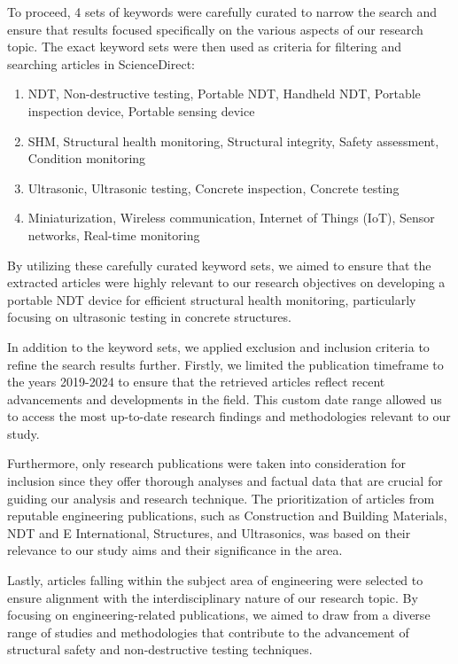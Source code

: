 \documentclass[journal, a4paper]{IEEEtran}
\begin{document}
To proceed, 4 sets of keywords were carefully curated to narrow the search and ensure that results focused
specifically on the various aspects of our research topic. The exact keyword sets were then used as criteria
for filtering and searching articles in ScienceDirect:

\begin{enumerate}
  \item NDT, Non-destructive testing, Portable NDT, Handheld NDT, Portable inspection device, Portable sensing device
  \item SHM, Structural health monitoring, Structural integrity, Safety assessment, Condition monitoring
  \item Ultrasonic, Ultrasonic testing, Concrete inspection, Concrete testing
  \item Miniaturization, Wireless communication, Internet of Things (IoT), Sensor networks, Real-time monitoring
\end{enumerate}

By utilizing these carefully curated keyword sets,
we aimed to ensure that the extracted articles were highly relevant to our research objectives on developing
a portable NDT device for efficient structural health monitoring, particularly focusing on ultrasonic testing
in concrete structures. 

In addition to the keyword sets, we applied exclusion and inclusion criteria to refine the search results further.
Firstly, we limited the publication timeframe to the years 2019-2024 to ensure that the retrieved articles reflect
recent advancements and developments in the field. This custom date range allowed us to access the most up-to-date
research findings and methodologies relevant to our study.

Furthermore, only research publications were taken into consideration for inclusion since they offer thorough
analyses and factual data that are crucial for guiding our analysis and research technique.
The prioritization of articles from reputable engineering publications, such as Construction and Building Materials,
NDT and E International, Structures, and Ultrasonics, was based on their relevance to our study aims
and their significance in the area.

Lastly, articles falling within the subject area of engineering were selected to ensure alignment
with the interdisciplinary nature of our research topic. By focusing on engineering-related publications,
we aimed to draw from a diverse range of studies and methodologies that contribute to the advancement
of structural safety and non-destructive testing techniques.
\end{document}
